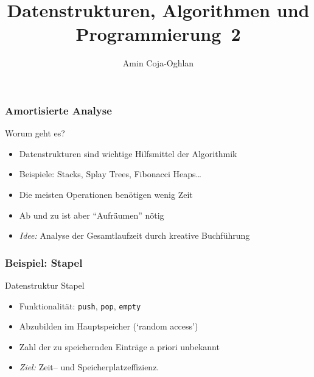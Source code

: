 \documentclass[aspectratio=1610, 11pt]{beamer}
\title{Datenstrukturen, Algorithmen und Programmierung~2}
\author[A.~Coja-Oghlan]{Amin Coja-Oghlan}
\institute[DAP2]{Lehrstuhl Informatik 2\\Fakult\"at f\"ur Informatik}
\newcommand{\mytitle}{Amortisierte Analyse}
\begin{document}
\frame[plain]{\titlepage}

\begin{frame}\frametitle{\mytitle}
	\begin{exampleblock}{Worum geht es?}
		\begin{itemize}
			\item Datenstrukturen sind wichtige Hilfsmittel der Algorithmik
			\item \alert{Beispiele:} Stacks, Splay Trees, Fibonacci Heaps\dots
			\item Die meisten Operationen ben\"otigen wenig Zeit
			\item Ab und zu ist aber ``Aufr\"aumen'' n\"otig
			\item \emph{Idee:} Analyse der Gesamtlaufzeit durch kreative Buchf\"uhrung 
		\end{itemize}
	\end{exampleblock}
\end{frame}


\begin{frame}\frametitle{Beispiel: Stapel}
	\begin{exampleblock}{Datenstruktur Stapel}
		\begin{itemize}
			\item Funktionalit\"at: {\tt push}, {\tt pop}, {\tt empty}
			\item Abzubilden im Hauptspeicher (`random access')
			\item Zahl der zu speichernden Eintr\"age a priori unbekannt
			\item \emph{Ziel:} Zeit-- und Speicherplatzeffizienz.
		\end{itemize}
	\end{exampleblock}
\end{frame}
\end{document}
